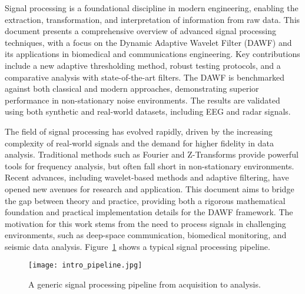 \documentclass{article}
\begin{document}
Signal processing is a foundational discipline in modern engineering, enabling the extraction, transformation, and interpretation of information from raw data. This document presents a comprehensive overview of advanced signal processing techniques, with a focus on the Dynamic Adaptive Wavelet Filter (DAWF) and its applications in biomedical and communications engineering. Key contributions include a new adaptive thresholding method, robust testing protocols, and a comparative analysis with state-of-the-art filters. The DAWF is benchmarked against both classical and modern approaches, demonstrating superior performance in non-stationary noise environments. The results are validated using both synthetic and real-world datasets, including EEG and radar signals.

The field of signal processing has evolved rapidly, driven by the increasing complexity of real-world signals and the demand for higher fidelity in data analysis. Traditional methods such as Fourier and Z-Transforms provide powerful tools for frequency analysis, but often fall short in non-stationary environments. Recent advances, including wavelet-based methods and adaptive filtering, have opened new avenues for research and application. This document aims to bridge the gap between theory and practice, providing both a rigorous mathematical foundation and practical implementation details for the DAWF framework. The motivation for this work stems from the need to process signals in challenging environments, such as deep-space communication, biomedical monitoring, and seismic data analysis. Figure~\ref{fig:intro_fig} shows a typical signal processing pipeline.
\begin{figure}[h!]
\centering
\texttt{[image: intro\_pipeline.jpg]}
\caption{A generic signal processing pipeline from acquisition to analysis.}
\label{fig:intro_fig}
\end{figure}
\end{document}
